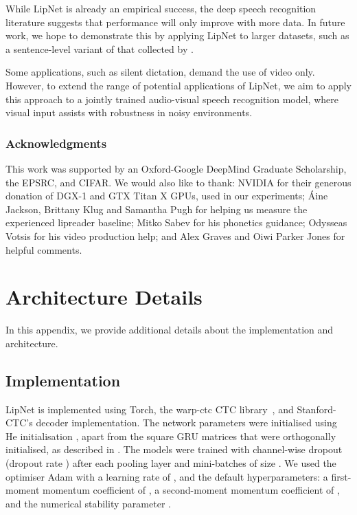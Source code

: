 \documentclass{article}
\begin{document}
While LipNet is already an empirical success, the deep speech recognition literature \citep{amodei2015deep} suggests that performance will only improve with more data.
In future work, we hope to demonstrate this by applying LipNet to larger datasets, such as a sentence-level variant of that collected by \citet{chung2016lip}.

Some applications, such as silent dictation, demand the use of video only. However, to extend the range of potential applications of LipNet,  
we aim to apply this approach to a jointly trained audio-visual speech recognition model, where visual input assists with robustness in noisy environments. 

 

\subsubsection*{Acknowledgments}

This work was supported by an Oxford-Google DeepMind Graduate Scholarship, the EPSRC, and CIFAR. We would also like to thank: NVIDIA for their generous donation of DGX-1 and GTX Titan X GPUs, used in our experiments; \'Aine Jackson, Brittany Klug and Samantha Pugh for helping us measure the experienced lipreader baseline; Mitko Sabev for his phonetics guidance; Odysseas Votsis for his video production help; and Alex Graves and Oiwi Parker Jones for helpful comments.
 
\renewcommand*{\bibfont}{\small}
\setlength{\bibsep}{1ex}



\newpage
\appendix
\section{Architecture Details}
\label{app:hyperparams}

In this appendix, we provide additional details about the implementation and architecture.

\subsection{Implementation}

LipNet is implemented using Torch, the warp-ctc CTC library~\citep{amodei2015deep}, and Stanford-CTC's decoder implementation.
The network parameters were initialised using He initialisation \citep{he2015delving}, apart from the square GRU matrices that were orthogonally initialised, as described in \citep{chung2014empirical}. The models were trained with channel-wise dropout (dropout rate ) after each pooling layer and mini-batches of size . We used the optimiser Adam \citep{kingma2014adam} with a learning rate of , and the default hyperparameters: a first-moment momentum coefficient of , a second-moment momentum coefficient of , and the numerical stability parameter .
\end{document}
